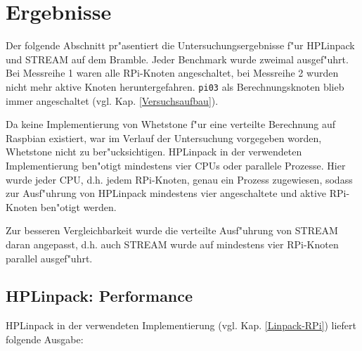 
\section{Ergebnisse}\label{Ergebnisse}

Der folgende Abschnitt pr"asentiert die Untersuchungsergebnisse f"ur HPLinpack und STREAM auf dem Bramble. Jeder Benchmark wurde zweimal ausgef"uhrt. Bei Messreihe 1 waren alle RPi-Knoten angeschaltet, bei Messreihe 2 wurden nicht mehr aktive Knoten heruntergefahren. \texttt{pi03} als Berechnungsknoten blieb immer angeschaltet (vgl. Kap. \ref{Versuchsaufbau}).

Da keine Implementierung von Whetstone f"ur eine verteilte Berechnung auf Raspbian existiert, war im Verlauf der Untersuchung vorgegeben worden, Whetstone nicht zu ber"ucksichtigen. HPLinpack in der verwendeten Implementierung ben"otigt mindestens vier CPUs oder parallele Prozesse. Hier wurde jeder CPU, d.h. jedem RPi-Knoten, genau ein Prozess zugewiesen, sodass zur Ausf"uhrung von HPLinpack mindestens vier angeschaltete und aktive RPi-Knoten ben"otigt werden. 

Zur besseren Vergleichbarkeit wurde die verteilte Ausf"uhrung von STREAM daran angepasst, d.h. auch STREAM wurde auf mindestens vier RPi-Knoten parallel ausgef"uhrt. 

\subsection{HPLinpack: Performance}\label{Ergebnisse-HPL}

HPLinpack in der verwendeten Implementierung (vgl. Kap. \ref{Linpack-RPi}) liefert folgende Ausgabe:

